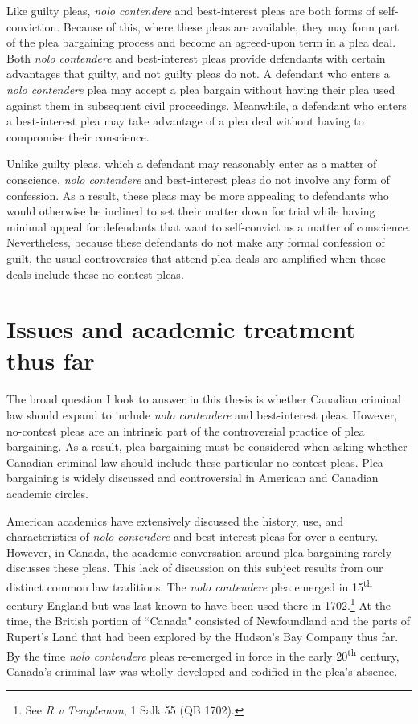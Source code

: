 Like guilty pleas, \textit{nolo contendere} and best-interest pleas are both forms of self-conviction. Because of this, where these pleas are available, they may form part of the plea bargaining process and become an agreed-upon term in a plea deal. Both \textit{nolo contendere} and best-interest pleas provide defendants with certain advantages that guilty, and not guilty pleas do not. A defendant who enters a \textit{nolo contendere} plea may accept a plea bargain without having their plea used against them in subsequent civil proceedings. Meanwhile, a defendant who enters a best-interest plea may take advantage of a plea deal without having to compromise their conscience.

Unlike guilty pleas, which a defendant may reasonably enter as a matter of conscience, \textit{nolo contendere} and best-interest pleas do not involve any form of confession. As a result, these pleas may be more appealing to defendants who would otherwise be inclined to set their matter down for trial while having minimal appeal for defendants that want to self-convict as a matter of conscience. Nevertheless, because these defendants do not make any formal confession of guilt, the usual controversies that attend plea deals are amplified when those deals include these no-contest pleas. 

\section{Issues and academic treatment thus far}

The broad question I look to answer in this thesis is whether Canadian criminal law should expand to include \textit{nolo contendere} and best-interest pleas. However, no-contest pleas are an intrinsic part of the controversial practice of plea bargaining. As a result, plea bargaining must be considered when asking whether Canadian criminal law should include these particular no-contest pleas. Plea bargaining is widely discussed and controversial in American and Canadian academic circles. 

American academics have extensively discussed the history, use, and characteristics of \textit{nolo contendere} and best-interest pleas for over a century. However, in Canada, the academic conversation around plea bargaining rarely discusses these pleas. This lack of discussion on this subject results from our distinct common law traditions. The \textit{nolo contendere} plea emerged in 15\textsuperscript{th} century England but was last known to have been used there in 1702.\footnote{See \textit{R v Templeman}, 1 Salk 55 (QB 1702).} At the time, the British portion of ``Canada" consisted of Newfoundland and the parts of Rupert's Land that had been explored by the Hudson's Bay Company thus far. By the time \textit{nolo contendere} pleas re-emerged in force in the early 20\textsuperscript{th} century, Canada's criminal law was wholly developed and codified in the plea's absence.

